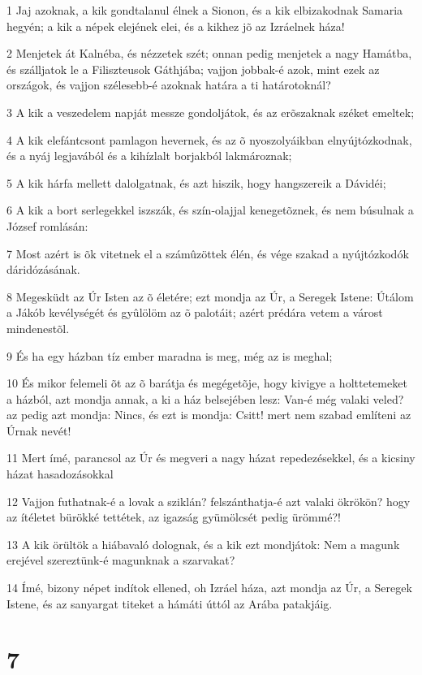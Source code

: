 \par 1 Jaj azoknak, a kik gondtalanul élnek a Sionon, és a kik elbizakodnak Samaria hegyén; a kik a népek elejének elei, és a kikhez jõ az Izráelnek háza!
\par 2 Menjetek át Kalnéba, és nézzetek szét; onnan pedig menjetek a nagy Hamátba, és szálljatok le a Filiszteusok Gáthjába; vajjon jobbak-é azok, mint ezek az országok, és vajjon szélesebb-é azoknak határa a ti határotoknál?
\par 3 A kik a veszedelem napját messze gondoljátok, és az erõszaknak széket emeltek;
\par 4 A kik elefántcsont pamlagon hevernek, és az õ nyoszolyáikban elnyújtózkodnak, és a nyáj legjavából és a kihízlalt borjakból lakmároznak;
\par 5 A kik hárfa mellett dalolgatnak, és azt hiszik, hogy hangszereik a Dávidéi;
\par 6 A kik a bort serlegekkel iszszák, és szín-olajjal kenegetõznek, és nem búsulnak a József romlásán:
\par 7 Most azért is õk vitetnek el a számûzöttek élén, és vége szakad a nyújtózkodók dáridózásának.
\par 8 Megesküdt az Úr Isten az õ életére; ezt mondja az Úr, a Seregek Istene: Útálom a Jákób kevélységét és gyûlölöm az õ palotáit; azért prédára vetem a várost mindenestõl.
\par 9 És ha egy házban tíz ember maradna is meg, még az is meghal;
\par 10 És mikor felemeli õt az õ barátja és megégetõje, hogy kivigye a holttetemeket a házból, azt mondja annak, a ki a ház belsejében lesz: Van-é még valaki veled? az pedig azt mondja: Nincs, és ezt is mondja: Csitt! mert nem szabad említeni az Úrnak nevét!
\par 11 Mert ímé, parancsol az Úr és megveri a nagy házat repedezésekkel, és a kicsiny házat hasadozásokkal
\par 12 Vajjon futhatnak-é a lovak a sziklán? felszánthatja-é azt valaki ökrökön? hogy az ítéletet bürökké tettétek, az igazság gyümölcsét pedig ürömmé?!
\par 13 A kik örültök a hiábavaló dolognak, és a kik ezt mondjátok: Nem a magunk erejével szereztünk-é magunknak a szarvakat?
\par 14 Ímé, bizony népet indítok ellened, oh Izráel háza, azt mondja az Úr, a Seregek Istene, és az sanyargat titeket a hámáti úttól az Arába patakjáig.

\chapter{7}

